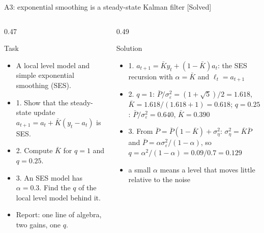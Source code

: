 \begin{frame}{A3: exponential smoothing is a steady-state Kalman filter [Solved]}
\itemsize{\scriptsize}
\begin{columns}[T]
\begin{column}{0.47\textwidth}
\begin{block}{Task}
\begin{itemize}
    \item A local level model and simple exponential smoothing (SES).
    \item 1. Show that the steady-state update $a_{t+1} = a_t + \bar K(y_t - a_t)$ is SES.
    \item 2. Compute $\bar K$ for $q = 1$ and $q = 0.25$.
    \item 3. An SES model has $\alpha = 0.3$. Find the $q$ of the local level model behind it.
    \item Report: one line of algebra, two gains, one $q$.
\end{itemize}
\end{block}
\end{column}
\begin{column}{0.49\textwidth}
\begin{exampleblock}{Solution}
\begin{itemize}
    \item 1. $a_{t+1} = \bar Ky_t + (1 - \bar K)a_t$: the SES recursion with $\alpha = \bar K$ and $\ell_t = a_{t+1}$
    \item 2. $q = 1$: $\bar P/\sigma^2_\varepsilon = (1 + \sqrt5)/2 = 1.618$, $\bar K = 1.618/(1.618 + 1) = 0.618$; $q = 0.25$: $\bar P/\sigma^2_\varepsilon = 0.640$, $\bar K = 0.390$
    \item 3. From $\bar P = \bar P(1 - \bar K) + \sigma^2_\eta$: $\sigma^2_\eta = \bar K\bar P$ and $\bar P = \alpha\sigma^2_\varepsilon/(1 - \alpha)$, so $q = \alpha^2/(1 - \alpha) = 0.09/0.7 = 0.129$
    \item a small $\alpha$ means a level that moves little relative to the noise
\end{itemize}
\end{exampleblock}
\end{column}
\end{columns}
\end{frame}

